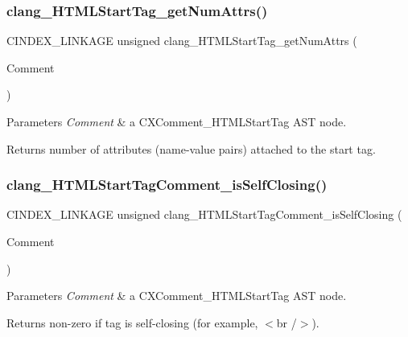 \subsubsection{\texorpdfstring{clang\+\_\+\+H\+T\+M\+L\+Start\+Tag\+\_\+get\+Num\+Attrs()}{clang\_HTMLStartTag\_getNumAttrs()}}
{\footnotesize\ttfamily C\+I\+N\+D\+E\+X\+\_\+\+L\+I\+N\+K\+A\+GE unsigned clang\+\_\+\+H\+T\+M\+L\+Start\+Tag\+\_\+get\+Num\+Attrs (\begin{DoxyParamCaption}\item[{\mbox{\hyperlink{structCXComment}{C\+X\+Comment}}}]{Comment }\end{DoxyParamCaption})}


\begin{DoxyParams}{Parameters}
{\em Comment} & a {\ttfamily C\+X\+Comment\+\_\+\+H\+T\+M\+L\+Start\+Tag} A\+ST node.\\
\hline
\end{DoxyParams}
\begin{DoxyReturn}{Returns}
number of attributes (name-\/value pairs) attached to the start tag. 
\end{DoxyReturn}
\mbox{\label{group__CINDEX__COMMENT_ga052be5f208a0ef2f76e3e9923a96ef19}} 
\subsubsection{\texorpdfstring{clang\+\_\+\+H\+T\+M\+L\+Start\+Tag\+Comment\+\_\+is\+Self\+Closing()}{clang\_HTMLStartTagComment\_isSelfClosing()}}
{\footnotesize\ttfamily C\+I\+N\+D\+E\+X\+\_\+\+L\+I\+N\+K\+A\+GE unsigned clang\+\_\+\+H\+T\+M\+L\+Start\+Tag\+Comment\+\_\+is\+Self\+Closing (\begin{DoxyParamCaption}\item[{\mbox{\hyperlink{structCXComment}{C\+X\+Comment}}}]{Comment }\end{DoxyParamCaption})}


\begin{DoxyParams}{Parameters}
{\em Comment} & a {\ttfamily C\+X\+Comment\+\_\+\+H\+T\+M\+L\+Start\+Tag} A\+ST node.\\
\hline
\end{DoxyParams}
\begin{DoxyReturn}{Returns}
non-\/zero if tag is self-\/closing (for example, $<$br /$>$). 
\end{DoxyReturn}
\mbox{\label{group__CINDEX__COMMENT_ga684a46f5993fe907016aba5dbe9d1d9e}} 
